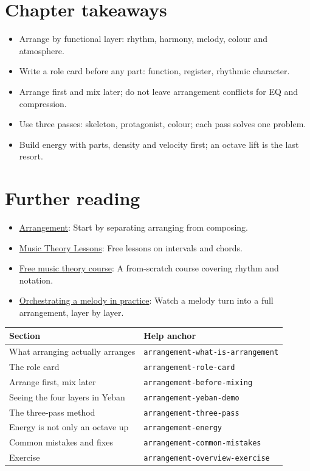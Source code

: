 \section{Chapter takeaways}
\label{sec:overview-takeaways}

\begin{itemize}
\item Arrange by functional layer: rhythm, harmony, melody, colour and atmosphere.
\item Write a role card before any part: function, register, rhythmic character.
\item Arrange first and mix later; do not leave arrangement conflicts for EQ and compression.
\item Use three passes: skeleton, protagonist, colour; each pass solves one problem.
\item Build energy with parts, density and velocity first; an octave lift is the last resort.
\end{itemize}

\section{Further reading}
\label{sec:01-overview-further-reading}
\begin{itemize}
  \item \href{https://en.wikipedia.org/wiki/Arrangement}{Arrangement}: Start by separating arranging from composing.
  \item \href{https://www.musictheory.net/lessons}{Music Theory Lessons}: Free lessons on intervals and chords.
  \item \href{https://www.youtube.com/watch?v=6gHEIF0rT2w}{Free music theory course}: A from-scratch course covering rhythm and notation.
  \item \href{https://www.youtube.com/watch?v=Mf6ZKAV0ZU4}{Orchestrating a melody in practice}: Watch a melody turn into a full arrangement, layer by layer.
\end{itemize}

\begin{helpmapping}
\begin{longtable}{p{}p{}}
\toprule
Section & Help anchor \\
\midrule
What arranging actually arranges & \texttt{arrangement-what-is-arrangement} \\
The role card & \texttt{arrangement-role-card} \\
Arrange first, mix later & \texttt{arrangement-before-mixing} \\
Seeing the four layers in Yeban & \texttt{arrangement-yeban-demo} \\
The three-pass method & \texttt{arrangement-three-pass} \\
Energy is not only an octave up & \texttt{arrangement-energy} \\
Common mistakes and fixes & \texttt{arrangement-common-mistakes} \\
Exercise & \texttt{arrangement-overview-exercise} \\
\bottomrule
\end{longtable}
\end{helpmapping}
